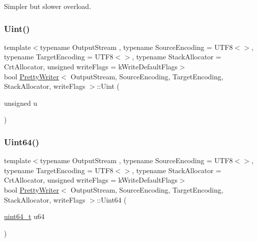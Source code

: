 Simpler but slower overload. 

\mbox{\label{classPrettyWriter_a8c82302877a5588eae77eb7d042c49ef}} 
\subsubsection{\texorpdfstring{Uint()}{Uint()}}
{\footnotesize\ttfamily template$<$typename Output\+Stream , typename Source\+Encoding  = U\+T\+F8$<$$>$, typename Target\+Encoding  = U\+T\+F8$<$$>$, typename Stack\+Allocator  = Crt\+Allocator, unsigned write\+Flags = k\+Write\+Default\+Flags$>$ \\
bool \hyperlink{classPrettyWriter}{Pretty\+Writer}$<$ Output\+Stream, Source\+Encoding, Target\+Encoding, Stack\+Allocator, write\+Flags $>$\+::Uint (\begin{DoxyParamCaption}\item[{unsigned}]{u }\end{DoxyParamCaption})\hspace{0.3cm}{\ttfamily [inline]}}

\mbox{\label{classPrettyWriter_aba75ac1f13c2629b2a55ffbf3d8a116c}} 
\subsubsection{\texorpdfstring{Uint64()}{Uint64()}}
{\footnotesize\ttfamily template$<$typename Output\+Stream , typename Source\+Encoding  = U\+T\+F8$<$$>$, typename Target\+Encoding  = U\+T\+F8$<$$>$, typename Stack\+Allocator  = Crt\+Allocator, unsigned write\+Flags = k\+Write\+Default\+Flags$>$ \\
bool \hyperlink{classPrettyWriter}{Pretty\+Writer}$<$ Output\+Stream, Source\+Encoding, Target\+Encoding, Stack\+Allocator, write\+Flags $>$\+::Uint64 (\begin{DoxyParamCaption}\item[{\hyperlink{stdint_8h_aec6fcb673ff035718c238c8c9d544c47}{uint64\+\_\+t}}]{u64 }\end{DoxyParamCaption})\hspace{0.3cm}{\ttfamily [inline]}}

\mbox{\label{classPrettyWriter_a6f244ecc94fd5b134d424033b1574b7e}} 
